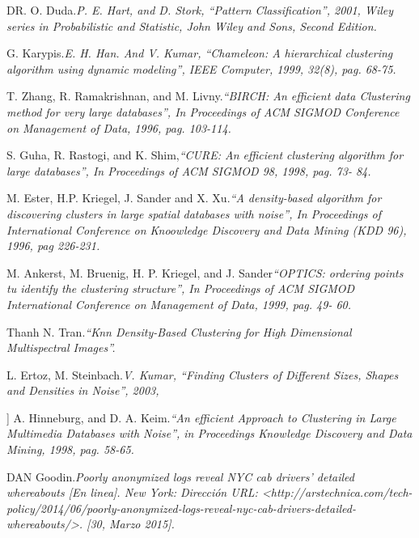 \documentclass[a4paper, 11pt, oneside]{article}
\theoremstyle{definition}
\theoremstyle{remark}
\begin{document}
\begin{thebibliography}{99}

DR. O. Duda.\emph{P. E. Hart, and D. Stork, “Pattern Classification”, 2001, Wiley series in Probabilistic and Statistic, John Wiley and Sons, Second Edition.}

 G. Karypis.\emph{E. H. Han. And V. Kumar, “Chameleon: A hierarchical clustering algorithm using dynamic modeling”, IEEE Computer, 1999, 32(8), pag. 68-75.}

T. Zhang, R. Ramakrishnan, and M. Livny.\emph{“BIRCH: An efficient data Clustering method for very large databases”, In Proceedings of ACM SIGMOD Conference on Management of Data, 1996, pag. 103-114.}

S. Guha, R. Rastogi, and K. Shim,\emph{“CURE: An efficient clustering algorithm for large databases”, In Proceedings of ACM SIGMOD 98, 1998, pag. 73- 84.}

M. Ester, H.P. Kriegel, J. Sander and X. Xu.\emph{“A density-based algorithm for discovering clusters in large spatial databases with noise”, In Proceedings of International Conference on Knoowledge Discovery and Data Mining (KDD 96), 1996, pag 226-231.}

M. Ankerst, M. Bruenig, H. P. Kriegel, and J. Sander\emph{“OPTICS: ordering points tu identify the clustering structure”, In Proceedings of ACM SIGMOD International Conference on Management of Data, 1999, pag. 49- 60.}

Thanh N. Tran.\emph{“Knn Density-Based Clustering for High Dimensional Multispectral Images”.}

L. Ertoz, M. Steinbach.\emph{V. Kumar, “Finding Clusters of Different Sizes, Shapes and Densities in Noise”, 2003,}

\bibitem[9]{] A. Hinneburg, and D. A. Keim.}] A. Hinneburg, and D. A. Keim.\emph{“An efficient Approach to Clustering in Large Multimedia Databases with Noise”, in Proceedings Knowledge Discovery and Data Mining, 1998, pag. 58-65.}


DAN Goodin.\emph{Poorly anonymized logs reveal NYC cab drivers’ detailed whereabouts [En linea]. New York: Dirección URL: <http://arstechnica.com/tech-policy/2014/06/poorly-anonymized-logs-reveal-nyc-cab-drivers-detailed-whereabouts/>. [30, Marzo 2015].}


\end{thebibliography}
\end{document}
